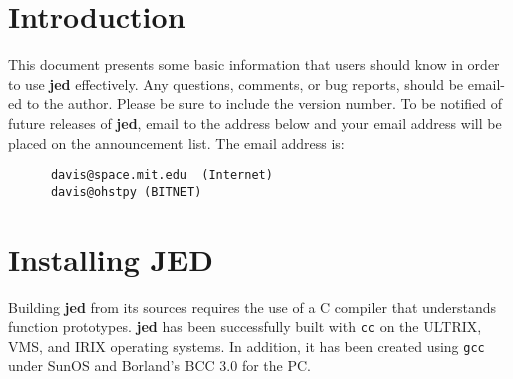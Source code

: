 %
%

\setlength{\oddsidemargin}{0mm}
\setlength{\evensidemargin}{0mm}
\setlength{\textwidth}{160mm}
\setlength{\topmargin}{-10mm}
\setlength{\textheight}{210mm}
\setlength{\parindent}{0mm}
\setlength{\parskip}{5mm}

\def\mytitle{The JED Editor}

\newlength{\pagewidth}
\setlength{\pagewidth}{\textwidth}

\makeatletter
\def\ps@headings{\def\@oddfoot{}%
\def\@oddhead{\makebox[\textwidth][l]{\underline{\hbox to \pagewidth{\bf
\mytitle\hfill\thepage}}}}%
\def\@evenfoot{}%
\def\@evenhead{\makebox[\textwidth][l]{\underline{\hbox to \pagewidth{\bf
\mytitle\hfill\thepage}}}}}%
\pagestyle{headings}

\newcommand{\slang}{{\bf S-Lang}}
\newcommand{\jed}{{\bf jed}}
\newcommand{\exmp}[1]{{\tt #1}}
\newcommand{\var}[1]{{\tt #1}}
\newcommand{\key}[1]{{\sc #1}}


\tableofcontents
\pagebreak

\section{Introduction}

 This document presents some basic information that users should know in
 order to use \jed{} effectively.  Any questions, comments, or bug reports,
 should be email-ed to the author. Please be sure to include the version
 number.  To be notified of future releases of \jed{}, email to the address
 below and your email address will be placed on the announcement list. The
 email address is:
\begin{verbatim}
      davis@space.mit.edu  (Internet)
      davis@ohstpy (BITNET)
\end{verbatim}

\section{Installing JED}

 Building \jed{} from its sources requires the use of a C compiler that
 understands function prototypes.  \jed{} has been successfully built with
 \verb|cc| on the ULTRIX, VMS, and IRIX operating systems.  In addition, it
 has been created using \verb|gcc| under SunOS and Borland's BCC 3.0 for the
 PC.

